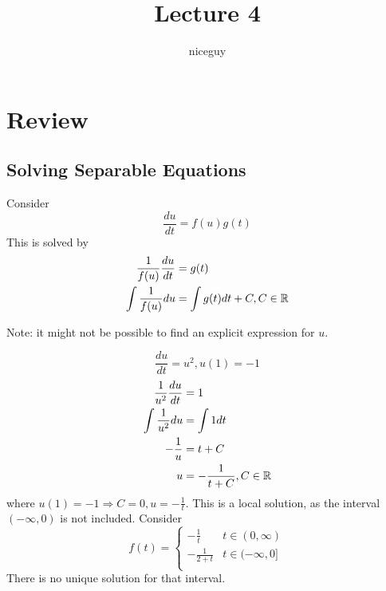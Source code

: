 \documentclass[12pt]{article}
\author{niceguy}
\title{Lecture 4}
\begin{document}
\maketitle

\section{Review}

\subsection{Solving Separable Equations}

Consider $$\frac{du}{dt} = f(u)g(t)$$
This is solved by
\begin{align*}
	\frac{1}{f(u)} \frac{du}{dt} &= g(t) \\
	\int \frac{1}{f(u)} du &= \int g(t)dt + C, C \in \mathbb{R} \\
\end{align*}

Note: it might not be possible to find an explicit expression for $u$.

\begin{ex}
	$$\frac{du}{dt} = u^2, u(1) = -1$$
	\begin{align*}
		\frac{1}{u^2} \frac{du}{dt} &= 1 \\
		\int \frac{1}{u^2} du &= \int 1 dt \\
		-\frac{1}{u} &= t + C \\
		u &= -\frac{1}{t+C}, C \in \mathbb{R} \\
	\end{align*}
	where $u(1) = -1 \Rightarrow C = 0, u = -\frac{1}{t}$. This is a local solution, as the interval $(-\infty, 0)$ is not included. Consider
	$$f(t) = \begin{cases} -\frac{1}{t} & t \in (0,\infty) \\ -\frac{1}{2+t} & t \in (-\infty, 0] \\ \end{cases}$$
	There is no unique solution for that interval.
\end{ex}
\end{document}
